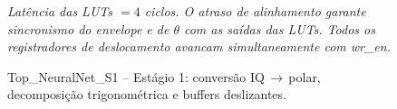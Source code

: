 \begin{figure}[H]
{%
}

\vspace{3mm}
\noindent\textit{Lat\^{e}ncia das LUTs $= 4$ ciclos. O atraso de alinhamento garante sincronismo do envelope e de $\theta$ com as sa\'{i}das das LUTs. Todos os registradores de deslocamento avancam simultaneamente com \textsf{wr\_en}.}

\caption{Top\_NeuralNet\_S1 -- Est\'{a}gio 1: convers\~{a}o IQ$\,\rightarrow\,$polar, decomposi\c{c}\~{a}o trigonom\'{e}trica e buffers deslizantes.}
\label{fig:top_neuralnet_s1}
\end{figure}
